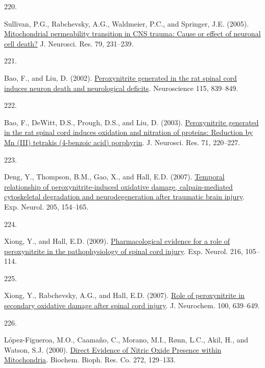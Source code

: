 \documentclass[
]{article}
\newlength{\cslhangindent}
\newlength{\csllabelwidth}
\newlength{\cslentryspacingunit} %
\newenvironment{CSLReferences}[2] %
 {%
  \setlength{\parindent}{0pt}
  \ifodd #1
  \let\oldpar\par
  \def\par{\hangindent=\cslhangindent\oldpar}
  \fi
  \setlength{\parskip}{#2\cslentryspacingunit}
 }%
 {}
\newcommand{\CSLLeftMargin}[1]{\parbox[t]{\csllabelwidth}{#1}}
\newcommand{\CSLRightInline}[1]{\parbox[t]{\linewidth - \csllabelwidth}{#1}\break}
\begin{document}
\begin{CSLReferences}{0}{0}
\leavevmode{}%
\CSLLeftMargin{220. }
\CSLRightInline{Sullivan, P.G., Rabchevsky, A.G., Waldmeier, P.C., and Springer, J.E. (2005). \href{https://doi.org/10.1002/jnr.20292}{Mitochondrial permeability transition in {CNS} trauma: {Cause} or effect of neuronal cell death?} J. Neurosci. Res. 79, 231--239.}

\leavevmode{}%
\CSLLeftMargin{221. }
\CSLRightInline{Bao, F., and Liu, D. (2002). \href{https://doi.org/10.1016/S0306-4522(02)00506-7}{Peroxynitrite generated in the rat spinal cord induces neuron death and neurological deficits}. Neuroscience 115, 839--849.}

\leavevmode{}%
\CSLLeftMargin{222. }
\CSLRightInline{Bao, F., DeWitt, D.S., Prough, D.S., and Liu, D. (2003). \href{https://doi.org/10.1002/jnr.10481}{Peroxynitrite generated in the rat spinal cord induces oxidation and nitration of proteins: {Reduction} by {Mn} ({III}) tetrakis (4-benzoic acid) porphyrin}. J. Neurosci. Res. 71, 220--227.}

\leavevmode{}%
\CSLLeftMargin{223. }
\CSLRightInline{Deng, Y., Thompson, B.M., Gao, X., and Hall, E.D. (2007). \href{https://doi.org/10.1016/j.expneurol.2007.01.023}{Temporal relationship of peroxynitrite-induced oxidative damage, calpain-mediated cytoskeletal degradation and neurodegeneration after traumatic brain injury}. Exp. Neurol. 205, 154--165.}

\leavevmode{}%
\CSLLeftMargin{224. }
\CSLRightInline{Xiong, Y., and Hall, E.D. (2009). \href{https://doi.org/10.1016/j.expneurol.2008.11.025}{Pharmacological evidence for a role of peroxynitrite in the pathophysiology of spinal cord injury}. Exp. Neurol. 216, 105--114.}

\leavevmode{}%
\CSLLeftMargin{225. }
\CSLRightInline{Xiong, Y., Rabchevsky, A.G., and Hall, E.D. (2007). \href{https://doi.org/10.1111/j.1471-4159.2006.04312.x}{Role of peroxynitrite in secondary oxidative damage after spinal cord injury}. J. Neurochem. 100, 639--649.}

\leavevmode{}%
\CSLLeftMargin{226. }
\CSLRightInline{López-Figueroa, M.O., Caamaño, C., Morano, M.I., Rønn, L.C., Akil, H., and Watson, S.J. (2000). \href{https://doi.org/10.1006/bbrc.2000.2748}{Direct {Evidence} of {Nitric Oxide Presence} within {Mitochondria}}. Biochem. Bioph. Res. Co. 272, 129--133.}


\end{CSLReferences}
\end{document}
